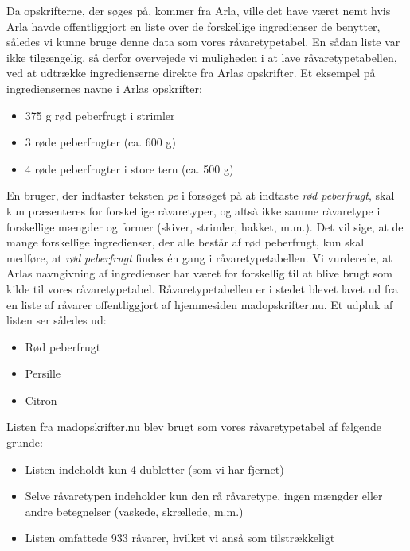 Da opskrifterne, der søges på, kommer fra Arla, ville det have været nemt hvis Arla havde offentliggjort en liste over de forskellige ingredienser de benytter, således vi kunne bruge denne data som vores råvaretypetabel. En sådan liste var ikke tilgængelig, så derfor overvejede vi muligheden i at lave råvaretypetabellen, ved at udtrække ingredienserne direkte fra Arlas opskrifter. Et eksempel på ingrediensernes navne i Arlas opskrifter:

\begin{itemize} [noitemsep]
  \item 375 g rød peberfrugt i strimler
  \item 3 røde peberfrugter (ca. 600 g)
  \item 4 røde peberfrugter i store tern (ca. 500 g)
\end{itemize}

En bruger, der indtaster teksten \textit{pe} i forsøget på at indtaste \textit{rød peberfrugt}, skal kun præsenteres for forskellige råvaretyper, og altså ikke samme råvaretype i forskellige mængder og former (skiver, strimler, hakket, m.m.). Det vil sige, at de mange forskellige ingredienser, der alle består af rød peberfrugt, kun skal medføre, at \textit{rød peberfrugt} findes én gang i råvaretypetabellen. Vi vurderede, at Arlas navngivning af ingredienser har været for forskellig til at blive brugt som kilde til vores råvaretypetabel. Råvaretypetabellen er i stedet blevet lavet ud fra en liste af råvarer offentliggjort af hjemmesiden madopskrifter.nu\cite{ingrediensliste}. Et udpluk af listen ser således ud:

\begin{itemize} [noitemsep]
  \item Rød peberfrugt
  \item Persille
  \item Citron
\end{itemize}

Listen fra madopskrifter.nu blev brugt som vores råvaretypetabel af følgende grunde:

\begin{itemize} [noitemsep]
  \item Listen indeholdt kun 4 dubletter (som vi har fjernet)
  \item Selve råvaretypen indeholder kun den rå råvaretype, ingen mængder eller andre betegnelser (vaskede, skrællede, m.m.)
  \item Listen omfattede 933 råvarer, hvilket vi anså som tilstrækkeligt 
\end{itemize}

